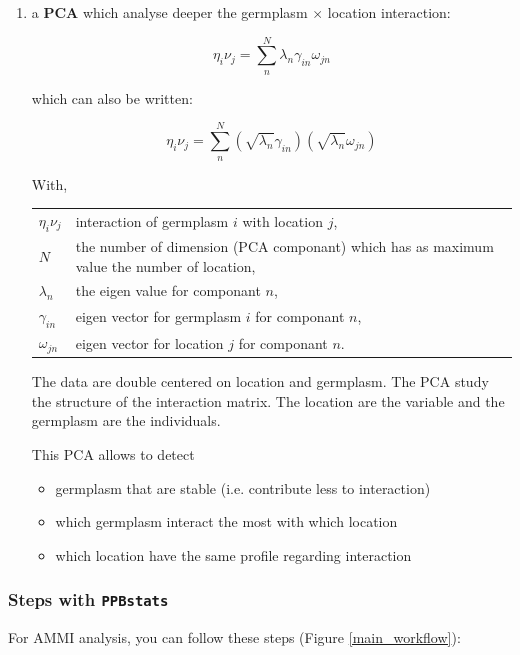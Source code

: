 \documentclass{book}\usepackage[]{graphicx}\usepackage[]{color}
\newcommand{\pack}{\texttt{PPBstats}}
\begin{document}
\begin{enumerate}
\item a \textbf{PCA} which analyse deeper the germplasm $\times$ location interaction: 

\begin{displaymath}
\eta_{i}\nu_{j} = \sum_{n}^{N} \lambda_{n} \gamma_{in} \omega_{jn}
\end{displaymath}

which can also be written:

\begin{displaymath}
\eta_{i}\nu_{j} = \sum_{n}^{N} (\sqrt{\lambda_{n}} \gamma_{in}) (\sqrt{\lambda_{n}} \omega_{jn})
\end{displaymath}


With,

\begin{tabular}{ll}
$\eta_{i}\nu_{j}$ & interaction of germplasm $i$ with location $j$, \\
$N$ & the number of dimension (PCA componant) which has as maximum value the number of location, \\
$\lambda_{n}$ & the eigen value for componant $n$, \\
$\gamma_{in}$ & eigen vector for germplasm $i$ for componant $n$, \\
$\omega_{jn}$ & eigen vector for  location $j$  for componant $n$. \\
\end{tabular}


The data are double centered on location and germplasm.
The PCA study the structure of the interaction matrix.
The location are the variable and the germplasm are the individuals.

This PCA allows to detect
\begin{itemize}
\item germplasm that are stable (i.e. contribute less to interaction)
\item which germplasm interact the most with which location
\item which location have the same profile regarding interaction
\end{itemize}

\end{enumerate}


\subsubsection{Steps with \pack}

For AMMI analysis, you can follow these steps (Figure \ref{main_workflow}):
\end{document}
